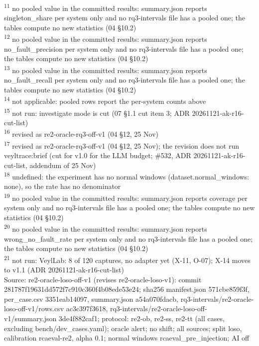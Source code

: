 \begin{table}[t]
\textsuperscript{11} no pooled value in the committed results: summary.json reports singleton\_share per system only and no rq3-intervals file has a pooled one; the tables compute no new statistics (04 \S{}10.2)\\
\textsuperscript{12} no pooled value in the committed results: summary.json reports no\_fault\_precision per system only and no rq3-intervals file has a pooled one; the tables compute no new statistics (04 \S{}10.2)\\
\textsuperscript{13} no pooled value in the committed results: summary.json reports no\_fault\_recall per system only and no rq3-intervals file has a pooled one; the tables compute no new statistics (04 \S{}10.2)\\
\textsuperscript{14} not applicable: pooled rows report the per-system counts above\\
\textsuperscript{15} not run: investigate mode is cut (07 \S{}1.1 cut item 3; ADR 20261121-ak-r16-cut-list)\\
\textsuperscript{16} revised as re2-oracle-rq3-off-v1 (04 \S{}12, 25 Nov)\\
\textsuperscript{17} revised as re2-oracle-rq3-off-v1 (04 \S{}12, 25 Nov); the revision does not run veyltrace:brief (cut for v1.0 for the LLM budget; \#532, ADR 20261121-ak-r16-cut-list, addendum of 25 Nov)\\
\textsuperscript{18} undefined: the experiment has no normal windows (dataset.normal\_windows: none), so the rate has no denominator\\
\textsuperscript{19} no pooled value in the committed results: summary.json reports coverage per system only and no rq3-intervals file has a pooled one; the tables compute no new statistics (04 \S{}10.2)\\
\textsuperscript{20} no pooled value in the committed results: summary.json reports wrong\_no\_fault\_rate per system only and no rq3-intervals file has a pooled one; the tables compute no new statistics (04 \S{}10.2)\\
\textsuperscript{21} not run: VeylLab: 8 of 120 captures, no adapter yet (X-11, O-07); X-14 moves to v1.1 (ADR 20261121-ak-r16-cut-list)\\
Source: re2-oracle-loso-off-v1 (revises re2-oracle-loso-v1): commit 281787f19631dd572f7c910c360f4b08ede53e24; sha256 manifest.json 571cbe859f3f, per\_case.csv 3351eab14097, summary.json a54a070fdacb, rq3-intervals/re2-oracle-loso-off-v1/rows.csv ac3c397f3618, rq3-intervals/re2-oracle-loso-off-v1/summary.json 3de4f882caf1; protocol: re2-ob, re2-ss, re2-tt (all cases, excluding bench/dev\_cases.yaml); oracle alert; no shift; all sources; split loso, calibration rcaeval-re2, alpha 0.1; normal windows rcaeval\_pre\_injection; AI off\\

\end{table}

